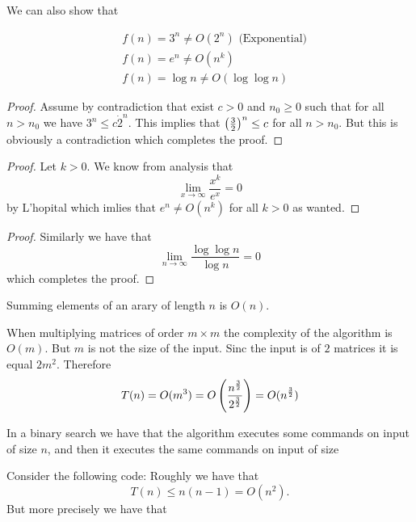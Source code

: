 \documentclass[11pt,a4paper]{article}
\begin{document}
We can also show that


\begin{align*}
    &f(n) = 3^n \neq O(2^n) \text{ (Exponential)} \\
    &f(n) = e^n \neq O(n^k) \\
    &f(n) = \log n \neq O(\log \log n)
\end{align*}

\begin{proof}
    Assume by contradiction that exist $c > 0$ and $n_0 \geq 0$ such that
    for all $n > n_0$ we have $3^n \le c \dot 2^n$.
    This implies that $\del{\frac 32}^n \le c$ for all $n > n_0$.
    But this is obviously a contradiction which completes the proof.
\end{proof}

\begin{proof}
    Let $k > 0$.
    We know from analysis that
    \[
        \lim_{x \to \infty} \frac{x^k}{e^x} = 0
    \]
    by L'hopital which imlies that $e^n \neq O(n^k)$ for all $k > 0$
    as wanted.
\end{proof}

\begin{proof}
    Similarly we have that
    \[
        \lim_{n \to \infty} \frac{\log \log n}{\log n} = 0
    \]
    which completes the proof.
\end{proof}

\begin{example}
    Summing elements of an arary of length $n$ is $O(n)$.
\end{example}

\begin{example}
    When multiplying matrices of order $m \times m$ the complexity
    of the algorithm is $O(m)$.
    But $m$ is not the size of the input.
    Sinc the input is of $2$ matrices it is equal $2m^2$.
    Therefore
    \[
        T(n) = O(m^3) = O\del{\frac{n^{\frac 32}}{2^{\frac 32}}} =
        O(n^{\frac 32})
    \]
\end{example}

\begin{example}
    In a binary search we have that the algorithm executes some commands
    on input of size $n$, and then it executes the same commands on input
    of size
\end{example}

\begin{example}
    Consider the following code:
    Roughly we have that
    \[
        T(n) \le n (n - 1) = O(n^2).
    \]
    But more precisely we have that
\end{example}
\end{document}
